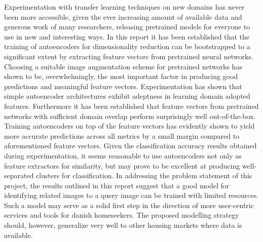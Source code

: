 Experimentation with transfer learning techniques on new domains has never been more accessible, given the ever increasing amount of available data and generous work of many researchers, releasing pretrained models for everyone to use in new and interesting ways.
\newline
\newline
In this report it has been established that the training of autoencoders for dimensionality reduction can be bootstrapped to a significant extent by extracting feature vectors from pretrained neural networks.
Choosing a suitable image augmentation scheme for pretrained networks has shown to be, overwhelmingly, the most important factor in producing good predictions and meaningful feature vectors.
Experimentation has shown that simple autoencoder architectures exhibit adeptness in learning domain adopted features.
Furthermore it has been established that feature vectors from pretrained networks with sufficient domain overlap perform surprisingly well out-of-the-box.
Training autoencoders on top of the feature vectors has evidently shown to yield more accurate predictions across all metrics by a small margin compared to aforementioned feature vectors.
\newline
\newline
Given the classification accuracy results obtained during experimentation, it seems reasonable to use autoencoders not only as feature extractors for similarity, but may prove to be excellent at producing well-separated clusters for classification.
\newline
\newline
In addressing the problem statement of this project, the results outlined in this report suggest that a good model for identifying related images to a query image can be trained with limited resources.
Such a model may serve as a solid first step in the direction of more user-centric services and tools for danish homeseekers.
The proposed modelling strategy should, however, generalize very well to other housing markets where data is available.



